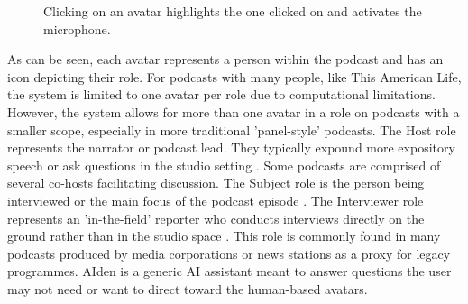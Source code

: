\documentclass[12pt]{report}
\begin{document}
\begin{myfont}
        \begin{figure}[H]
              \caption{Clicking on an avatar highlights the one clicked on and activates the microphone.}
              \label{fig:avatarpanel}
        \end{figure}
        
        \indent As can be seen, each avatar represents a person within the podcast and has an icon depicting their role. For podcasts with many people, like This American Life, the system is limited to one avatar per role due to computational limitations. However, the system allows for more than one avatar in a role on podcasts with a smaller scope, especially in more traditional 'panel-style' podcasts. The Host role represents the narrator or podcast lead. They typically expound more expository speech or ask questions in the studio setting \citep{Mao2020SpeechRecognition}. Some podcasts are comprised of several co-hosts facilitating discussion. The Subject role is the person being interviewed or the main focus of the podcast episode \citep{Mao2020SpeechRecognition}. The Interviewer role represents an 'in-the-field' reporter who conducts interviews directly on the ground rather than in the studio space \citep{Mao2020SpeechRecognition}. This role is commonly found in many podcasts produced by media corporations or news stations as a proxy for legacy programmes. AIden is a generic AI assistant meant to answer questions the user may not need or want to direct toward the human-based avatars.
        

\end{myfont}
\end{document}
